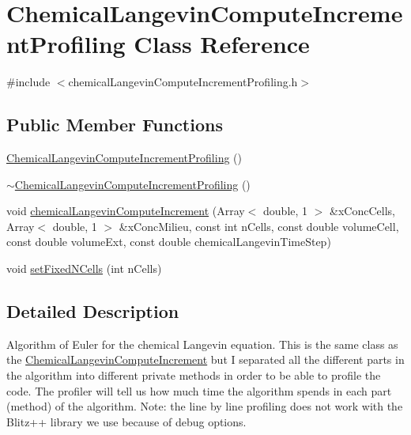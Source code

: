 \hypertarget{class_chemical_langevin_compute_increment_profiling}{\section{\-Chemical\-Langevin\-Compute\-Increment\-Profiling \-Class \-Reference}
\label{class_chemical_langevin_compute_increment_profiling}
}


{\ttfamily \#include $<$chemical\-Langevin\-Compute\-Increment\-Profiling.\-h$>$}

\subsection*{\-Public \-Member \-Functions}
\begin{DoxyCompactItemize}
\item 
\hyperlink{class_chemical_langevin_compute_increment_profiling_acf2fa8ef025d9caa07013523f07317ca}{\-Chemical\-Langevin\-Compute\-Increment\-Profiling} ()
\item 
\hyperlink{class_chemical_langevin_compute_increment_profiling_ad06a17ff8c95fad567d7a830ff51e940}{$\sim$\-Chemical\-Langevin\-Compute\-Increment\-Profiling} ()
\item 
void \hyperlink{class_chemical_langevin_compute_increment_profiling_a351f27bc7a346ffb478507de3790fd75}{chemical\-Langevin\-Compute\-Increment} (\-Array$<$ double, 1 $>$ \&x\-Conc\-Cells, \-Array$<$ double, 1 $>$ \&x\-Conc\-Milieu, const int n\-Cells, const double volume\-Cell, const double volume\-Ext, const double chemical\-Langevin\-Time\-Step)
\item 
void \hyperlink{class_chemical_langevin_compute_increment_profiling_ae7e483f24489bd467abd9ac01fc62ea5}{set\-Fixed\-N\-Cells} (int n\-Cells)
\end{DoxyCompactItemize}


\subsection{\-Detailed \-Description}
\-Algorithm of \-Euler for the chemical \-Langevin equation. \-This is the same class as the \hyperlink{class_chemical_langevin_compute_increment}{\-Chemical\-Langevin\-Compute\-Increment} but \-I separated all the different parts in the algorithm into different private methods in order to be able to profile the code. \-The profiler will tell us how much time the algorithm spends in each part (method) of the algorithm. \-Note\-: the line by line profiling does not work with the \-Blitz++ library we use because of debug options. 


